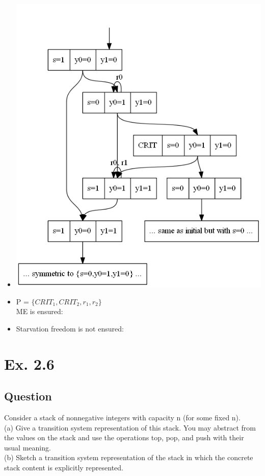 \documentclass[12pt]{article}
\begin{document}
\begin{itemize}
	\item \begin{centering}
		\includegraphics*[scale=0.5]{25c.png}
	\end{centering}
	\item P = $\{CRIT_1, CRIT_2, r_1, r_2\}$\\
		ME is ensured:
	\item Starvation freedom is not ensured:
\end{itemize}

\newpage
\section*{Ex. 2.6}
\subsection*{Question}
Consider a stack of nonnegative integers with capacity n (for some fixed n).\\
(a) Give a transition system representation of this stack. You may abstract from the values on
the stack and use the operations top, pop, and push with their usual meaning.\\
(b) Sketch a transition system representation of the stack in which the concrete stack content is
explicitly represented.
\end{document}
